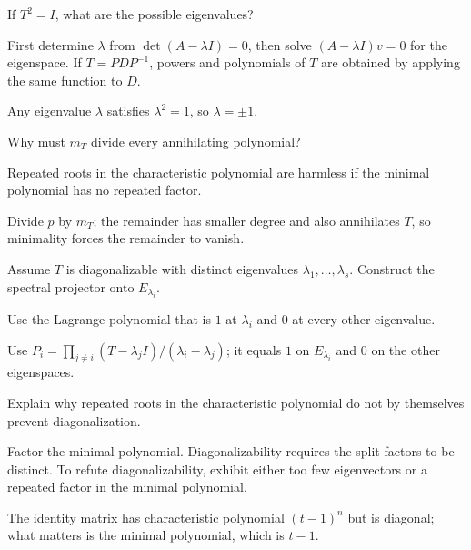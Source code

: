 \begin{exercise}\label{exr:i11-05}
If $T^2=I$, what are the possible eigenvalues?
\end{exercise}
\begin{hint}
First determine \(\lambda\) from \(\det(A-\lambda I)=0\), then solve \((A-\lambda I)v=0\) for the eigenspace. If \(T=PDP^{-1}\), powers and polynomials of \(T\) are obtained by applying the same function to \(D\).
\end{hint}
\begin{solution}
Any eigenvalue $\lambda$ satisfies $\lambda^2=1$, so $\lambda=\pm1$.
\end{solution}

\begin{exercise}\label{exr:i11-06}
Why must $m_T$ divide every annihilating polynomial?
\end{exercise}
\begin{hint}
Repeated roots in the characteristic polynomial are harmless if the minimal polynomial has no repeated factor.
\end{hint}
\begin{solution}
Divide $p$ by $m_T$; the remainder has smaller degree and also annihilates $T$, so minimality forces the remainder to vanish.
\end{solution}

\begin{exercise}\label{exr:i11-07}
Assume $T$ is diagonalizable with distinct eigenvalues $\lambda_1,\ldots,\lambda_s$. Construct the spectral projector onto $E_{\lambda_i}$.
\end{exercise}
\begin{hint}
Use the Lagrange polynomial that is \(1\) at \(\lambda_i\) and \(0\) at every other eigenvalue.
\end{hint}
\begin{solution}
Use $P_i=\prod_{j\ne i}(T-\lambda_jI)/(\lambda_i-\lambda_j)$; it equals $1$ on $E_{\lambda_i}$ and $0$ on the other eigenspaces.
\end{solution}

\begin{exercise}\label{exr:i11-08}
Explain why repeated roots in the characteristic polynomial do not by themselves prevent diagonalization.
\end{exercise}
\begin{hint}
Factor the minimal polynomial. Diagonalizability requires the split factors to be distinct. To refute diagonalizability, exhibit either too few eigenvectors or a repeated factor in the minimal polynomial.
\end{hint}
\begin{solution}
The identity matrix has characteristic polynomial $(t-1)^n$ but is diagonal; what matters is the minimal polynomial, which is $t-1$.
\end{solution}


